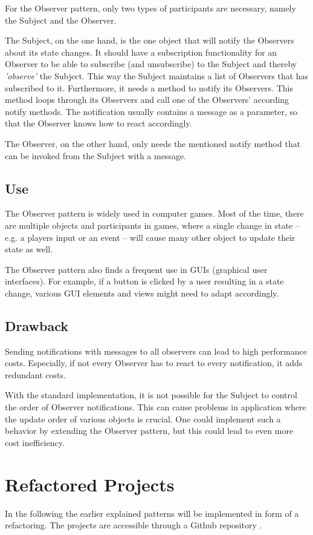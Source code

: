 \documentclass{bioinfo}
\begin{document}
For the Observer pattern, only two types of participants are necessary, namely the Subject and the Observer.

The Subject, on the one hand, is the one object that will notify the Observers about its state changes. It should have a subscription functionality for an Observer to be able to subscribe (and unsubscribe) to the Subject and thereby \textit{'observe'} the Subject. This way the Subject maintains a list of Observers that has subscribed to it. Furthermore, it needs a method to notify its Observers. This method loops through its Observers and call one of the Observers’ according notify methods. The notification usually contains a message as a parameter, so that the Observer knows how to react accordingly. \cite{dofac}

The Observer, on the other hand, only needs the mentioned notify method that can be invoked from the Subject with a message.


\subsection{Use}
The Observer pattern is widely used in computer games. Most of the time, there are multiple objects and participants in games, where a single change in state – e.g. a players input or an event – will cause many other object to update their state as well.

The Observer pattern also finds a frequent use in GUIs (graphical user interfaces). For example, if a button is clicked by a user resulting in a state change, various GUI elements and views might need to adapt accordingly. \cite{wiki:observer}

\subsection{Drawback}
Sending notifications with messages to all observers can lead to high performance costs. Especially, if not every Observer has to react to every notification, it adds redundant costs.

With the standard implementation, it is not possible for the Subject to control the order of Observer notifications. This can cause problems in application where the update order of various objects is crucial. One could implement such a behavior by extending the Observer pattern, but this could lead to even more cost inefficiency.


\section{Refactored Projects}
In the following the earlier explained patterns will be implemented in form of a refactoring. The projects are accessible through a Github repository \cite{github}.
\end{document}
